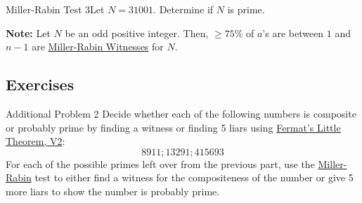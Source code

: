 \begin{example}
    {Miller-Rabin Test 3}Let \(N = 31001\). Determine if \(N\) is prime. 
\end{example}


\begin{note}
    \textbf{Note:} Let \(N\) be an odd positive integer. Then, \(\geq 75\%\) of \(a\)'s are between \(1\) and \(n - 1\) are \hyperref[Miller-Rabin Witness]{Miller-Rabin Witnesses} for \(N\).
\end{note}

\renewcommand{\theenumi}{\alph{enumi}}
\renewcommand{\labelenumi}{(\theenumi)}
\subsection{Exercises}

\begin{exercise}
    {Additional Problem 2} Decide whether each of the following numbers is composite or probably prime by finding a witness or finding 5 liars using \hyperref[thm:Fermat's Little Theorem, Version 2]{Fermat's Little Theorem, V2}:
    \[8911; 13291; 415693\]
    For each of the possible primes left over from the previous part, use the \hyperref[sec:Miller-Rabin]{Miller-Rabin} test to either find a witness for the compositeness of the number or give 5 more liars to show the number is probably prime.
\end{exercise}

